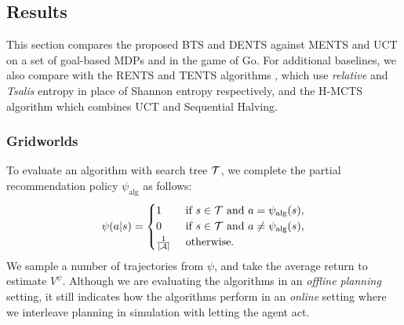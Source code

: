     










\subsection{Results} \label{sec:results}
    This section compares the proposed BTS and DENTS against MENTS and UCT on a set of goal-based MDPs and in the game of Go. For additional baselines, we also compare with the RENTS and TENTS algorithms %
    , which use \textit{relative} and \textit{Tsalis} entropy in place of Shannon entropy respectively, and the H-MCTS algorithm %
    which combines UCT and Sequential Halving.
    
    \subsubsection{Gridworlds} \label{sec:gridworlds}
    		To evaluate an algorithm with search tree $\mathcal{T}$, we complete the partial recommendation policy $\psi_{\text{alg}}$ as follows:
        \begin{align}
            \psi(a|s) =
            \begin{cases}
                1 & \text{ if } s\in\mathcal{T} \text{ and } a=\psi_{\text{alg}}(s), \\
                0 & \text{ if } s\in\mathcal{T} \text{ and } a\neq\psi_{\text{alg}}(s), \\
                \frac{1}{|\mathcal{A}|} & \text{ otherwise.}
            \end{cases} \label{eq:full_Recommend}
        \end{align}
        We sample a number of trajectories from $\psi$, and take the average return to estimate $V^{\psi}$. Although we are evaluating the algorithms in an \textit{offline planning} setting, it still indicates how the algorithms perform in an \textit{online} setting where we interleave planning in simulation with letting the agent act. 

